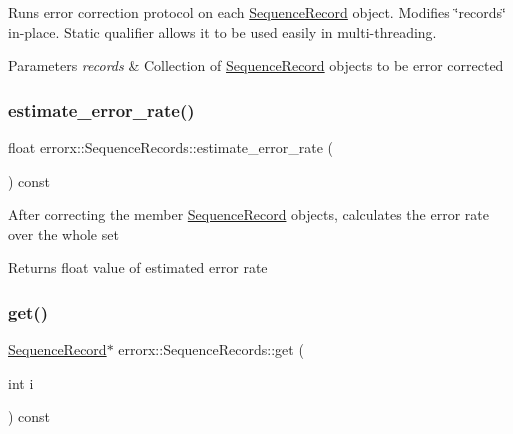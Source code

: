 Runs error correction protocol on each \mbox{\hyperlink{classerrorx_1_1_sequence_record}{Sequence\+Record}} object. Modifies \char`\"{}records\char`\"{} in-\/place. Static qualifier allows it to be used easily in multi-\/threading.


\begin{DoxyParams}{Parameters}
{\em records} & Collection of \mbox{\hyperlink{classerrorx_1_1_sequence_record}{Sequence\+Record}} objects to be error corrected \\
\hline
\end{DoxyParams}
\mbox{\label{classerrorx_1_1_sequence_records_a84905f56b5cebe34c7300be425964a5b}} 
\subsubsection{\texorpdfstring{estimate\+\_\+error\+\_\+rate()}{estimate\_error\_rate()}}
{\footnotesize\ttfamily float errorx\+::\+Sequence\+Records\+::estimate\+\_\+error\+\_\+rate (\begin{DoxyParamCaption}{ }\end{DoxyParamCaption}) const}

After correcting the member \mbox{\hyperlink{classerrorx_1_1_sequence_record}{Sequence\+Record}} objects, calculates the error rate over the whole set

\begin{DoxyReturn}{Returns}
float value of estimated error rate 
\end{DoxyReturn}
\mbox{\label{classerrorx_1_1_sequence_records_a368bff7f01e34b2d6eedd14c8995d9be}} 
\subsubsection{\texorpdfstring{get()}{get()}}
{\footnotesize\ttfamily \mbox{\hyperlink{classerrorx_1_1_sequence_record}{Sequence\+Record}}$\ast$ errorx\+::\+Sequence\+Records\+::get (\begin{DoxyParamCaption}\item[{int}]{i }\end{DoxyParamCaption}) const}

